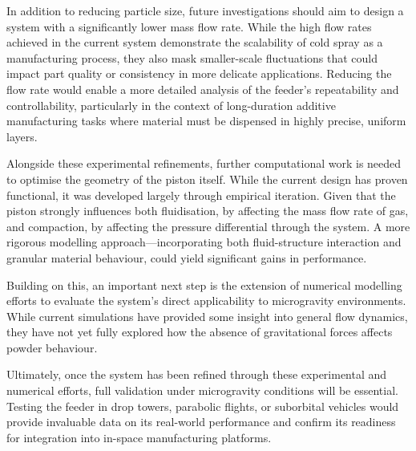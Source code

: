 In addition to reducing particle size, future investigations should aim to design a system with a significantly lower mass flow rate. While the high flow rates achieved in the current system demonstrate the scalability of cold spray as a manufacturing process, they also mask smaller-scale fluctuations that could impact part quality or consistency in more delicate applications. Reducing the flow rate would enable a more detailed analysis of the feeder's repeatability and controllability, particularly in the context of long-duration additive manufacturing tasks where material must be dispensed in highly precise, uniform layers. 

Alongside these experimental refinements, further computational work is needed to optimise the geometry of the piston itself. While the current design has proven functional, it was developed largely through empirical iteration. Given that the piston strongly influences both fluidisation, by affecting the mass flow rate of gas, and compaction, by affecting the pressure differential through the system. A more rigorous modelling approach—incorporating both fluid-structure interaction and granular material behaviour, could yield significant gains in performance. 

Building on this, an important next step is the extension of numerical modelling efforts to evaluate the system's direct applicability to microgravity environments. While current simulations have provided some insight into general flow dynamics, they have not yet fully explored how the absence of gravitational forces affects powder behaviour. 

Ultimately, once the system has been refined through these experimental and numerical efforts, full validation under microgravity conditions will be essential. Testing the feeder in drop towers, parabolic flights, or suborbital vehicles would provide invaluable data on its real-world performance and confirm its readiness for integration into in-space manufacturing platforms. 


